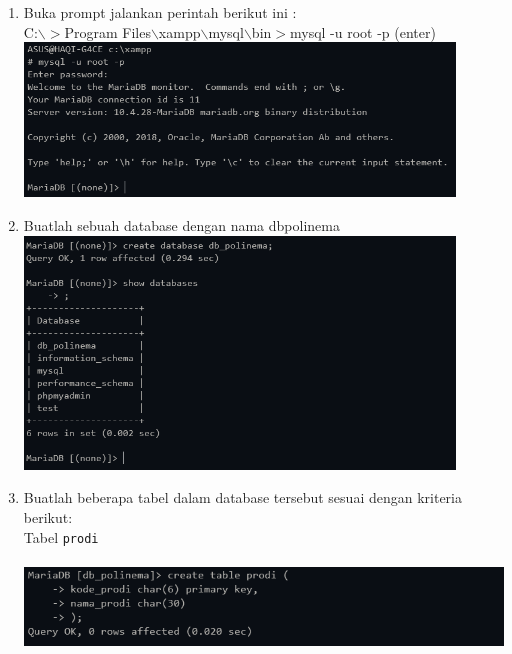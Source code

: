 \documentclass[12pt,titlepage]{article}
\begin{document}
\begin{enumerate}
    \item Buka prompt jalankan perintah berikut ini :\\
    C:$\backslash>$Program Files$\backslash$xampp$\backslash$mysql$\backslash$bin$>$mysql -u root -p (enter) \\
    \includegraphics[width=0.9\textwidth]{images/figures/practicum-1.PNG}
    \item Buatlah sebuah database dengan nama db\textunderscore polinema \\
    \includegraphics[width=0.9\textwidth]{images/figures/practicum-2.PNG}
    \item Buatlah beberapa tabel dalam database tersebut sesuai dengan kriteria berikut: \\
    Tabel \texttt{prodi} \\
     \\
    \includegraphics[width=.9\textwidth]{images/figures/practicum-4.PNG}

\end{enumerate}
\end{document}

